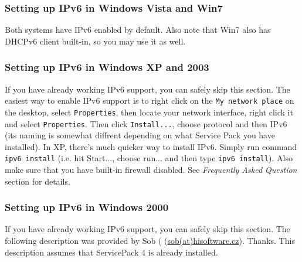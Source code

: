 \subsubsection{Setting up IPv6 in Windows Vista and Win7}
Both systems have IPv6 enabled by default. Also note that Win7 also
has DHCPv6 client built-in, so you may use it as well.

\subsubsection{Setting up IPv6 in Windows XP and 2003}
If you have already working IPv6 support, you can safely skip this section.
The easiest way to enable IPv6 support is to right click on the
\verb+My network place+ on the desktop, select \verb+Properties+, then locate
your network interface, right click it and select \verb+Properties+. Then
click \verb+Install...+, choose protocol and then IPv6 (its naming is
somewhat diffrent depending on what Service Pack you have installed).
In XP, there's much quicker way to install IPv6. Simply run command
\verb+ipv6 install+ (i.e. hit Start..., choose run... and then type
\verb+ipv6 install+). Also make sure that you have built-in firewall
disabled. See \emph{Frequently Asked Question} section for details.

\subsubsection{Setting up IPv6 in Windows 2000}
If you have already working IPv6 support, you can safely skip this
section. The following description was provided by Sob (
(\href{mailto:sob(at)hisoftware.cz}{sob(at)hisoftware.cz}). Thanks. This
description assumes that ServicePack 4 is already installed.

